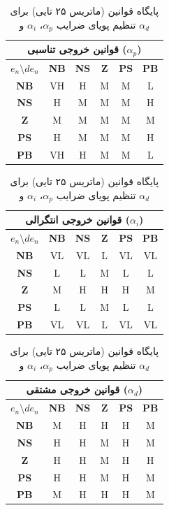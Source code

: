 	\begin{table}[htbp]
		\centering
		\caption{پایگاه قوانین (ماتریس ۲۵ تایی) برای تنظیم پویای ضرایب $\alpha_p$، $\alpha_i$ و $\alpha_d$}
		\label{tab:method-fuzzy-rules}
		
		\vspace{0.3cm}
		\begin{tabular}{|c|c|c|c|c|c|}
			\hline
			\multicolumn{6}{|c|}{\textbf{قوانین خروجی تناسبی ($\alpha_p$)}} \\
			\hline
			$e_n \setminus de_n$ & \textbf{NB} & \textbf{NS} & \textbf{Z} & \textbf{PS} & \textbf{PB} \\
			\hline
			\textbf{NB} & VH & H & M & M & L \\
			\hline
			\textbf{NS} & H  & M & M & M & H  \\
			\hline
			\textbf{Z}  & M  & M & M & M & M  \\
			\hline
			\textbf{PS} & H  & M & M & M & H  \\
			\hline
			\textbf{PB} & VH & H & M & M & L \\
			\hline
		\end{tabular}
		
		\vspace{0.6cm}
		\begin{tabular}{|c|c|c|c|c|c|}
			\hline
			\multicolumn{6}{|c|}{\textbf{قوانین خروجی انتگرالی ($\alpha_i$)}} \\
			\hline
			$e_n \setminus de_n$ & \textbf{NB} & \textbf{NS} & \textbf{Z} & \textbf{PS} & \textbf{PB} \\
			\hline
			\textbf{NB} & VL & VL & L & VL & VL \\
			\hline
			\textbf{NS} & L  & L  & M & L  & L  \\
			\hline
			\textbf{Z}  & M  & H  & H & H  & M  \\
			\hline
			\textbf{PS} & L  & L  & M & L  & L  \\
			\hline
			\textbf{PB} & VL & VL & L & VL & VL \\
			\hline
		\end{tabular}
		
		\vspace{0.6cm}
		\begin{tabular}{|c|c|c|c|c|c|}
			\hline
			\multicolumn{6}{|c|}{\textbf{قوانین خروجی مشتقی ($\alpha_d$)}} \\
			\hline
			$e_n \setminus de_n$ & \textbf{NB} & \textbf{NS} & \textbf{Z} & \textbf{PS} & \textbf{PB} \\
			\hline
			\textbf{NB} & M  & H  & H & H  & M  \\
			\hline
			\textbf{NS} & H  & H  & M & H  & M  \\
			\hline
			\textbf{Z}  & H  & H  & M & H  & H  \\
			\hline
			\textbf{PS} & H  & H  & M & H  & M  \\
			\hline
			\textbf{PB} & M  & H  & H & H  & M  \\
			\hline
		\end{tabular}
	\end{table}
	

